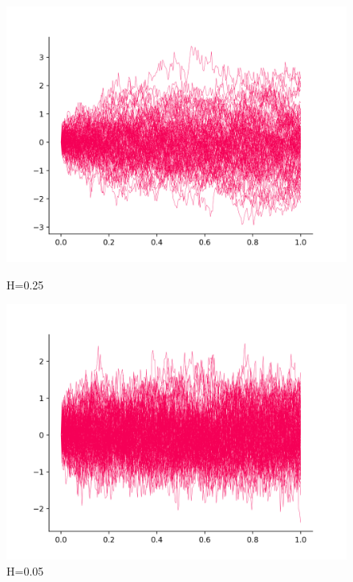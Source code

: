 \documentclass[a4paper,12pt]{article}
\numberwithin{equation}{section}
\begin{document}
	\begin{figure}[H]
		\includegraphics[scale=0.4]{image-1-25.png}
		\caption{H=0.25}
		\endminipage\hfill
		\includegraphics[scale=0.4]{image-1-05.png}
		\caption{H=0.05}
		\endminipage\hfill
	\end{figure}
	
\end{document}
